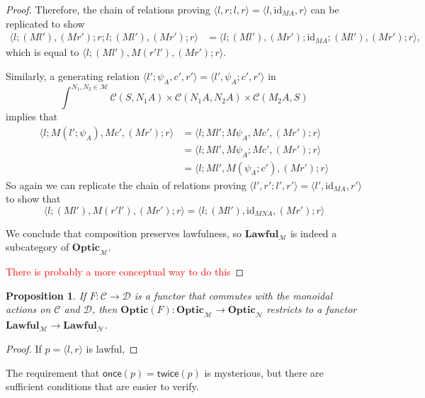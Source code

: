 \documentclass[11pt,a4paper]{article}
\theoremstyle{plain}
\newtheorem{proposition}[theorem]{Proposition}
\theoremstyle{definition}
\newcommand{\C}{\mathscr{C}}
\newcommand{\D}{\mathscr{D}}
\newcommand{\M}{\mathscr{M}}
\newcommand{\N}{\mathscr{N}}
\newcommand{\Optic}{\mathbf{Optic}}
\newcommand{\Lawful}{\mathbf{Lawful}}
\newcommand{\id}{\mathrm{id}}
\newcommand{\once}{\mathsf{once}}
\newcommand{\twice}{\mathsf{twice}}
\newcommand{\todo}[1]{\textcolor{red}{\small #1}}
\begin{document}
\begin{proof}
  Therefore, the chain of relations proving $\langle l, r;l, r \rangle = \langle l, \id_{MA}, r \rangle$ can be replicated to show
  \begin{align*}
    \langle l;(Ml'), (Mr');r;l;(Ml') , (Mr') ; r \rangle &= \langle l;(Ml'), (Mr');\id_{MA};(Ml') , (Mr') ; r \rangle,
  \end{align*}
  which is equal to $\langle l;(Ml'), M(r'l'), (Mr') ; r \rangle$.

  Similarly, a generating relation $\langle l';\psi_A, c', r' \rangle = \langle l', \psi_A ; c', r' \rangle$ in \[\int^{N_1, N_2 \in \M} \C(S, N_1 A) \times \C(N_1 A, N_2 A) \times \C(M_2 A, S)\]
  implies that
  \begin{align*}
    \langle l;M(l';\psi_A), Mc', (Mr') ; r \rangle
    &= \langle l;Ml';M\psi_A, Mc', (Mr') ; r \rangle \\
    &= \langle l;Ml', M\psi_A ; Mc', (Mr') ; r \rangle \\
    &= \langle l;Ml', M(\psi_A;c'), (Mr') ; r \rangle
  \end{align*}
  So again we can replicate the chain of relations proving $\langle l', r';l', r' \rangle = \langle l', \id_{MA}, r' \rangle$ to show that
  \[\langle l;(Ml'), M(r'l'), (Mr') ; r \rangle = \langle l;(Ml'), \id_{MNA}, (Mr') ; r \rangle \]

  We conclude that composition preserves lawfulness, so $\Lawful_\M$ is indeed a subcategory of $\Optic_\M$.

  \todo{There is probably a more conceptual way to do this}
\end{proof}

\begin{proposition}
  If $F : \C \to \D$ is a functor that commutes with the monoidal actions on $\C$ and $\D$, then $\Optic(F) : \Optic_\M \to \Optic_\N$ restricts to a functor $\Lawful_\M \to \Lawful_\N$.
\end{proposition}
\begin{proof}
  If $p = \langle l, r \rangle$ is lawful,
\end{proof}

The requirement that $\once(p) = \twice(p)$ is mysterious, but there are sufficient conditions that are easier to verify.
\end{document}
